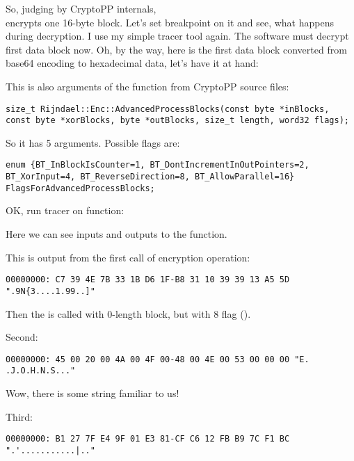 So, judging by CryptoPP internals, \\
 encrypts one 16-byte block.
Let's set breakpoint on it and see, what happens during decryption.
I use my simple tracer tool again.
The software must decrypt first data block now.
Oh, by the way, here is the first data block converted from base64 encoding to hexadecimal data,
let's have it at hand:



This is also arguments of the function from CryptoPP source files:

\begin{lstlisting}
size_t Rijndael::Enc::AdvancedProcessBlocks(const byte *inBlocks, const byte *xorBlocks, byte *outBlocks, size_t length, word32 flags);
\end{lstlisting}

So it has 5 arguments. Possible flags are:

\begin{lstlisting}
enum {BT_InBlockIsCounter=1, BT_DontIncrementInOutPointers=2, BT_XorInput=4, BT_ReverseDirection=8, BT_AllowParallel=16} FlagsForAdvancedProcessBlocks;
\end{lstlisting}

OK, run tracer on  function:



Here we can see inputs and outputs to the  function.

This is output from the first call of encryption operation:

\begin{lstlisting}
00000000: C7 39 4E 7B 33 1B D6 1F-B8 31 10 39 39 13 A5 5D ".9N{3....1.99..]"
\end{lstlisting}

Then the  is called with 0-length block, but with 8 flag ().

Second:

\begin{lstlisting}
00000000: 45 00 20 00 4A 00 4F 00-48 00 4E 00 53 00 00 00 "E. .J.O.H.N.S..."
\end{lstlisting}

Wow, there is some string familiar to us!

Third:

\begin{lstlisting}
00000000: B1 27 7F E4 9F 01 E3 81-CF C6 12 FB B9 7C F1 BC ".'...........|.."
\end{lstlisting}

